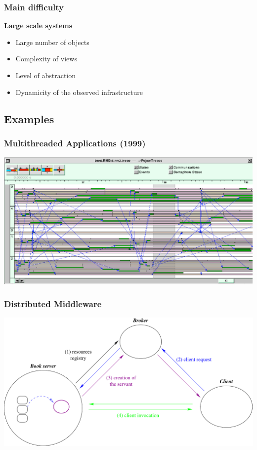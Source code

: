 \begin{frame}
\frametitle{Main difficulty}
\centerline{\alert{\large{\textbf{Large scale systems}}}}
\begin{itemize}
\item Large number of objects
\item Complexity of views
\item Level of abstraction
\item Dynamicity of the observed infrastructure

\end{itemize}
\end{frame}
\subsection{Examples}
\begin{frame}
\frametitle{Multithreaded Applications (1999)}
\includegraphics[width=\textwidth]{figures/Multithreaded.pdf}

\end{frame}

\begin{frame}
\frametitle{Distributed Middleware}
\includegraphics[width=\textwidth]{figures/ArchiTraderServerClient.pdf}
\end{frame}

